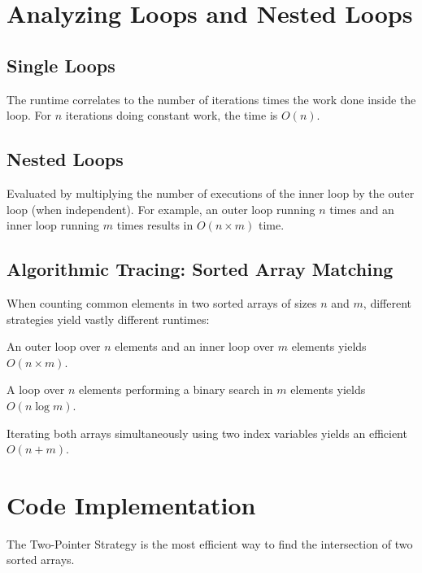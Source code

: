 \section{Analyzing Loops and Nested Loops}

\subsection{Single Loops}
The runtime correlates to the number of iterations times the work done inside the loop. For $n$ iterations doing constant work, the time is $O(n)$.

\subsection{Nested Loops}
Evaluated by multiplying the number of executions of the inner loop by the outer loop (when independent). For example, an outer loop running $n$ times and an inner loop running $m$ times results in $O(n \times m)$ time.

\subsection{Algorithmic Tracing: Sorted Array Matching}
When counting common elements in two sorted arrays of sizes $n$ and $m$, different strategies yield vastly different runtimes:

\begin{example}
An outer loop over $n$ elements and an inner loop over $m$ elements yields $O(n \times m)$.
\end{example}

\begin{example}
A loop over $n$ elements performing a binary search in $m$ elements yields $O(n \log m)$.
\end{example}

\begin{example}
Iterating both arrays simultaneously using two index variables yields an efficient $O(n + m)$.
\end{example}

\newpage
\section{Code Implementation}

The Two-Pointer Strategy is the most efficient way to find the intersection of two sorted arrays.

